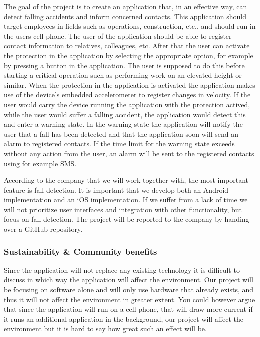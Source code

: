 \documentclass[12pt, a4paper, onecolumn]{article}
\begin{document}
		The goal of the project is to create an application that, in an effective way, can detect falling accidents and inform concerned contacts. This application should target employees in fields such as operations, construction, etc., and should run in the users cell phone. The user of the application should be able to register contact information to relatives, colleagues, etc. After that the user can activate the protection in the application by selecting the appropriate option, for example by pressing a button in the application. The user is supposed to do this before starting a critical operation such as performing work on an elevated height or similar. When the protection in the application is activated the application makes use of the device's embedded accelerometer to register changes in velocity. If the user would carry the device running the application with the protection actived, while the user would suffer a falling accident, the application would detect this and enter a warning state. In the warning state the application will notify the user that a fall has been detected and that the application soon will send an alarm to registered contacts. If the time limit for the warning state exceeds without any action from the user, an alarm will be sent to the registered contacts using for example SMS.
		
		According to the company that we will work together with, the most important feature is fall detection. It is important that we develop both an Android implementation and an iOS implementation. If we suffer from a lack of time we will not prioritize user interfaces and integration with other functionality, but focus on fall detection. The project will be reported to the company by handing over a GitHub repository.
		
		
		\subsubsection{Sustainability \& Community benefits}
		
		Since the application will not replace any existing technology it is difficult to discuss in which way the application will affect the environment. Our project will be focusing on software alone and will only use hardware that already exists, and thus it will not affect the environment in greater extent. You could however argue that since the application will run on a cell phone, that will draw more current if it runs an additional application in the background, our project will affect the environment but it is hard to say how great such an effect will be.
		
\end{document}
